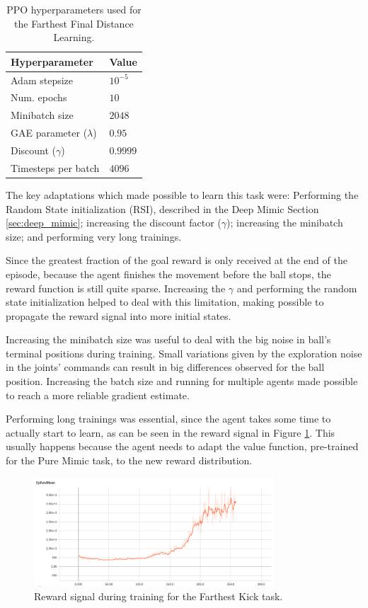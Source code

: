 \begin{table}[ht]
    \begin{tabular}{|l|l|}
    \hline
    Hyperparameter            & Value    \\  \hline
    Adam stepsize             & $10^{-5}$ \\
    Num. epochs               & $10$     \\
    Minibatch size            & $2048$     \\
    GAE parameter ($\lambda$) & $0.95$   \\
    Discount ($\gamma$)       & $0.9999$ \\
    Timesteps per batch       & $4096$   \\ \hline
    \end{tabular}
\centering
\caption{PPO hyperparameters used for the Farthest Final Distance Learning.}
\label{tab:ppo_far_kick}
\end{table}

The key adaptations which made possible to learn this task were: Performing the Random State initialization (RSI), described in the Deep Mimic Section \ref{sec:deep_mimic}; increasing the discount factor ($\gamma$); increasing the minibatch size; and performing very long trainings.

Since the greatest fraction of the goal reward is only received at the end of the episode, because the agent finishes the movement before the ball stops, the reward function is still quite sparse. Increasing the $\gamma$ and performing the random state initialization helped to deal with this limitation, making possible to propagate the reward signal into more initial states.

Increasing the minibatch size was useful to deal with the big noise in ball's terminal positions during training. Small variations given by the exploration noise in the joints' commands can result in big differences observed for the ball position. Increasing the batch size and running for multiple agents made possible to reach a more reliable gradient estimate.

Performing long trainings was essential, since the agent takes some time to actually start to learn, as can be seen in the reward signal in Figure \ref{fig:RL_far_kick}. This usually happens because the agent needs to adapt the value function, pre-trained for the Pure Mimic task, to the new reward distribution.

\begin{figure}[H]
    \centering
    \includegraphics[width=0.8\textwidth]{Chapter7/figures/rew_mean_far_kick.png} 
    \caption{Reward signal during training for the Farthest Kick task.}
    \label{fig:RL_far_kick}
\end{figure}

